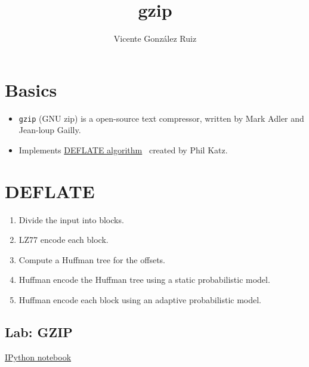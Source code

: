 \title{gzip}
\author{Vicente González Ruiz}
\maketitle
\tableofcontents

\section{Basics}
\begin{itemize}
\item
  \texttt{gzip} (GNU zip) is a open-source text compressor, written by
  Mark Adler and Jean-loup Gailly.
\item
  Implements \href{https://en.wikipedia.org/wiki/DEFLATE}{DEFLATE
algorithm}~\cite{deutsch1996deflate, deutsch1996gzip} created by Phil Katz.
\end{itemize}

\section{DEFLATE}
\begin{enumerate}
\def\labelenumi{\arabic{enumi}.}
\tightlist
\item
  Divide the input into blocks.
\item
  LZ77 encode each block.
\item
  Compute a Huffman tree for the offsets.
\item
  Huffman encode the Huffman tree using a static probabilistic model.
\item
  Huffman encode each block using an adaptive probabilistic model.
\end{enumerate}

\subsection{Lab: GZIP}
\href{https://nbviewer.jupyter.org/github/vicente-gonzalez-ruiz/gzip/blob/master/gzip.ipynb}{IPython notebook}


